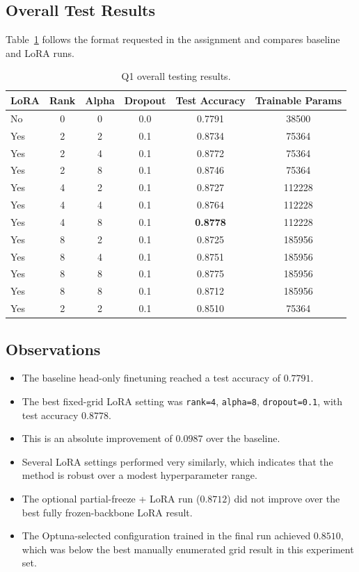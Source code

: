 \documentclass[11pt]{article}
\begin{document}
\subsection{Overall Test Results}
Table~\ref{tab:q1-test} follows the format requested in the assignment and compares baseline and LoRA runs.

\begin{table}[H]
\centering
\caption{Q1 overall testing results.}
\label{tab:q1-test}
\begin{tabular}{lccccc}
\toprule
LoRA & Rank & Alpha & Dropout & Test Accuracy & Trainable Params \\
\midrule
No & 0 & 0 & 0.0 & 0.7791 & 38500 \\
Yes & 2 & 2 & 0.1 & 0.8734 & 75364 \\
Yes & 2 & 4 & 0.1 & 0.8772 & 75364 \\
Yes & 2 & 8 & 0.1 & 0.8746 & 75364 \\
Yes & 4 & 2 & 0.1 & 0.8727 & 112228 \\
Yes & 4 & 4 & 0.1 & 0.8764 & 112228 \\
Yes & 4 & 8 & 0.1 & \textbf{0.8778} & 112228 \\
Yes & 8 & 2 & 0.1 & 0.8725 & 185956 \\
Yes & 8 & 4 & 0.1 & 0.8751 & 185956 \\
Yes & 8 & 8 & 0.1 & 0.8775 & 185956 \\
Yes & 8 & 8 & 0.1 & 0.8712 & 185956 \\
Yes & 2 & 2 & 0.1 & 0.8510 & 75364 \\
\bottomrule
\end{tabular}
\end{table}

\subsection{Observations}
\begin{itemize}
    \item The baseline head-only finetuning reached a test accuracy of \(0.7791\).
    \item The best fixed-grid LoRA setting was \texttt{rank=4}, \texttt{alpha=8}, \texttt{dropout=0.1}, with test accuracy \(0.8778\).
    \item This is an absolute improvement of \(0.0987\) over the baseline.
    \item Several LoRA settings performed very similarly, which indicates that the method is robust over a modest hyperparameter range.
    \item The optional partial-freeze + LoRA run (\(0.8712\)) did not improve over the best fully frozen-backbone LoRA result.
    \item The Optuna-selected configuration trained in the final run achieved \(0.8510\), which was below the best manually enumerated grid result in this experiment set.
\end{itemize}
\end{document}

